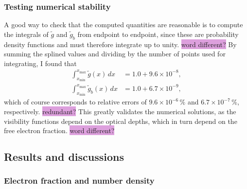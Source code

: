 \documentclass{aa}
\numberwithin{equation}{section}
\numberwithin{table}{section}
\numberwithin{figure}{section}
\begin{document}
\subsubsection{Testing numerical stability}
A good way to check that the computed quantities are reasonable is to compute the integrals of $\tilde{g}$ and $\tilde{g}_b$ from endpoint to endpoint, since these are probability density functions and must therefore integrate up to unity. \colorbox{Plum}{word different?} By summing the splined values and dividing by the number of points used for integrating, I found that
\begin{align*}
  \int_{x_\text{min}}^{x_\text{max}}\tilde{g}(x)\,dx &= 1.0+9.6\times10^{-8},
  \\
  \int_{x_\text{min}}^{x_\text{max}}\tilde{g}_b(x)\,dx &= 1.0+6.7\times10^{-9},
\end{align*}
which of course corresponds to relative errors of $9.6\times10^{-6}\,\%$ and $6.7\times10^{-7}\,\%$, respectively. \colorbox{Plum}{redundant?} This greatly validates the numerical solutions, as the visibility functions depend on the optical depths, which in turn depend on the free electron fraction. \colorbox{Plum}{word different?}


\subsection{Results and discussions}\label{subsec: II results}




\subsubsection{Electron fraction and number density}
\end{document}
